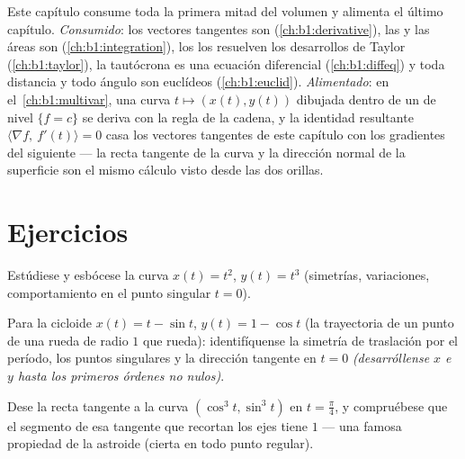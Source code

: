 \begin{remark}
\label{rem:b1:curves:perspectives}
Este capítulo consume toda la primera mitad del volumen y alimenta el
último capítulo. \emph{Consumido}: los vectores tangentes son
 (\cref{ch:b1:derivative}), las  y las
áreas son  (\cref{ch:b1:integration}), los
 los resuelven los desarrollos de Taylor
(\cref{ch:b1:taylor}), la tautócrona es una ecuación diferencial
 (\cref{ch:b1:diffeq}) y toda distancia y todo ángulo son
euclídeos (\cref{ch:b1:euclid}). \emph{Alimentado}: en
el~\cref{ch:b1:multivar}, una curva $t \mapsto (x(t), y(t))$ dibujada
dentro de un  de nivel $\{f = c\}$ se deriva con la regla de
la cadena, y la identidad resultante
$\langle \nabla f,\ f'(t)\rangle = 0$ casa los vectores tangentes de
este capítulo con los gradientes del siguiente --- la recta tangente
de la curva y la dirección normal de la superficie son el mismo
cálculo visto desde las dos orillas.
\end{remark}

\section{Ejercicios}

\begin{exercise}[$\star$]\label{exo:b1:curves:1}
Estúdiese y esbócese la curva $x(t) = t^2$, $y(t) = t^3$ (simetrías,
variaciones, comportamiento en el punto singular $t = 0$).
\end{exercise}

\begin{exercise}[$\star$]\label{exo:b1:curves:2}
Para la cicloide $x(t) = t - \sin t$, $y(t) = 1 - \cos t$ (la
trayectoria de un punto de una rueda de radio $1$ que rueda):
identifíquense la simetría de traslación por el período, los puntos
singulares y la dirección tangente en $t = 0$ \emph{(desarróllense
$x$ e $y$ hasta los primeros órdenes no nulos)}.
\end{exercise}

\begin{exercise}[$\star$]\label{exo:b1:curves:3}
Dese la recta tangente a la curva $(\cos^3 t, \sin^3 t)$ en
$t = \frac\pi4$, y compruébese que el segmento de esa tangente que
recortan los ejes tiene  $1$ --- una famosa propiedad de la
astroide (cierta en todo punto regular).
\end{exercise}

